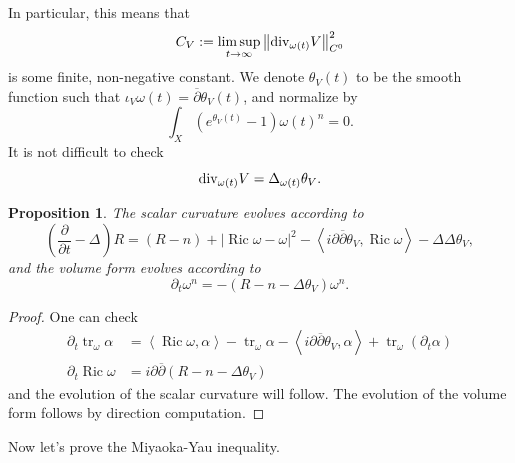 \documentclass[12pt]{article}
\newtheorem{proposition}[theorem]{Proposition}
\numberwithin{equation}{section}
\renewcommand{\d}{\partial}
\newcommand{\dbar}{\overline{\partial}}
\DeclareMathOperator{\Ric}{Ric}
\DeclareMathOperator{\tr}{tr}
\newcommand{\parabolic}[1]{\left(\frac{\d}{\d t} - \Delta_{#1}\right)}
\newcommand{\norm}[1]{\left\|#1\right\|}
\newcommand{\ip}[1]{\left\langle#1\right\rangle}
\renewcommand{\div}{\textnormal{div}}
\begin{document}
\noindent In particular, this means that 
\begin{equation}\label{divergence_norm}
    C_V := \limsup_{t \to \infty} \norm{\div_{\omega(t)} V}_{C^0}^2
\end{equation}
is some finite, non-negative constant. We denote $\theta_{V}(t)$ to be the smooth function such that $\iota_V \omega(t) = \dbar \theta_V(t)$, and normalize by
\begin{equation*}
    \int_X (e^{\theta_V(t)} -1)\omega(t)^n =0.
\end{equation*}
It is not difficult to check
\begin{equation*}
    \div_{\omega(t)} V = \Delta_{\omega(t)} \theta_V.
\end{equation*}

\begin{proposition}
The scalar curvature evolves according to
\begin{equation*}
    \parabolic{} R = (R-n) + |\Ric \omega - \omega|^2 - \ip{i\d\dbar \theta_V, \Ric \omega} - \Delta \Delta \theta_V,
\end{equation*}
and the volume form evolves according to
\begin{equation*}
    \d_t \omega^n = -(R - n - \Delta \theta_V ) \omega^n.
\end{equation*}
\end{proposition}

\begin{proof}
One can check
\begin{align*}
    \d_t \tr_{\omega} \alpha &= \ip{\Ric \omega, \alpha} - \tr_{\omega} \alpha - \ip{i\d\dbar \theta_V, \alpha} + \tr_{\omega} (\d_t \alpha)\\
    \d_t \Ric \omega &= i\d\dbar (R - n - \Delta \theta_V)
\end{align*}
and the evolution of the scalar curvature will follow. The evolution of the volume form follows by direction computation.
\end{proof}

\noindent Now let's prove the Miyaoka-Yau inequality.
\end{document}

